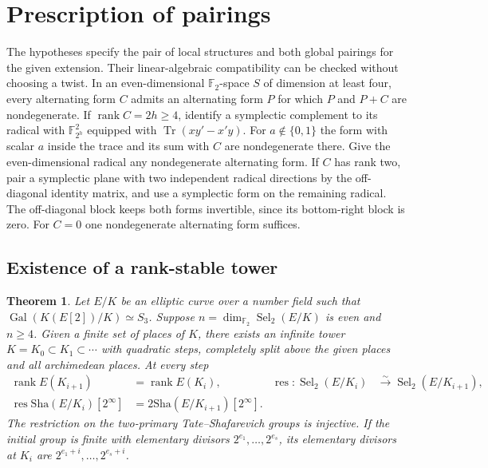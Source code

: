 \documentclass[11pt]{article}
\newtheorem{theorem}{Theorem}
\newcommand{\Sha}{\mathrm{Sha}}
\newcommand{\Sel}{\operatorname{Sel}}
\newcommand{\res}{\operatorname{res}}
\newcommand{\rk}{\operatorname{rank}}
\begin{document}
\section{Prescription of pairings}
The hypotheses specify the pair of local structures and both global
pairings for the given extension. Their linear-algebraic compatibility
can be checked without choosing a twist. In an even-dimensional
$\mathbb F_2$-space $S$ of dimension at least four, every alternating
form $C$ admits an alternating form $P$ for which $P$ and $P+C$ are
nondegenerate. If $\operatorname{rank} C=2h\ge4$, identify a symplectic
complement to its radical with $\mathbb F_{2^h}^2$ equipped with
$\operatorname{Tr}(xy'-x'y)$. For $a\notin\{0,1\}$ the form with
scalar $a$ inside the trace and its sum with $C$ are nondegenerate
there. Give the even-dimensional radical any nondegenerate alternating
form. If $C$ has rank two, pair a symplectic plane with two independent
radical directions by the off-diagonal identity matrix, and use a
symplectic form on the remaining radical. The off-diagonal block keeps
both forms invertible, since its bottom-right block is zero. For $C=0$
one nondegenerate alternating form suffices.

\subsection{Existence of a rank-stable tower}
\begin{theorem}\label{tower}
Let $E/K$ be an elliptic curve over a number field such that
$\operatorname{Gal}(K(E[2])/K)\simeq S_3$. Suppose
$n=\dim_{\mathbb F_2}\Sel_2(E/K)$ is even and $n\ge4$.
Given a finite set of places of $K$, there exists an infinite tower
$K=K_0\subset K_1\subset\cdots$ with quadratic steps, completely split
above the given places and all archimedean places. At every step
\begin{align*}
 \rk E(K_{i+1})&=\rk E(K_i),&
 \res:\Sel_2(E/K_i)&\xrightarrow{\sim}\Sel_2(E/K_{i+1}),\\
 \res\Sha(E/K_i)[2^\infty]&=2\Sha(E/K_{i+1})[2^\infty].
\end{align*}
The restriction on the two-primary Tate--Shafarevich groups is
injective. If the initial group is finite with elementary divisors
$2^{e_1},\ldots,2^{e_s}$, its elementary divisors at $K_i$ are
$2^{e_1+i},\ldots,2^{e_s+i}$.
\end{theorem}
\end{document}
